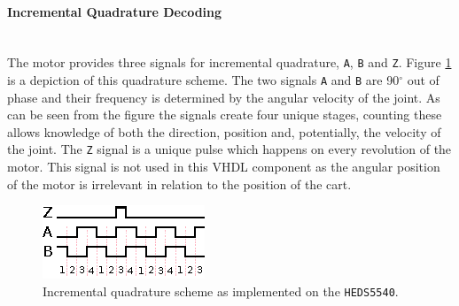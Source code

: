 \paragraph{Incremental Quadrature Decoding}~\\ %
\label{par:incremental_quadrature}
The motor provides three signals for incremental quadrature, \texttt{A}, \texttt{B} and \texttt{Z}. 
Figure \ref{fig:quadrature} is a depiction of this quadrature scheme.
The two signals \texttt{A} and \texttt{B} are 90$^\circ$ out of phase and their frequency is determined by the angular velocity of the joint.
As can be seen from the figure the signals create four unique stages, counting these allows knowledge of both the direction, position and, potentially, the velocity of the joint.
The \texttt{Z} signal is a unique pulse which happens on every revolution of the motor.
This signal is not used in this VHDL component as the angular position of the motor is irrelevant in relation to the position of the cart.

\begin{figure}[h]
	\centering
	\includegraphics[width=.5\linewidth]{graphics/quadrature}
	\caption{Incremental quadrature scheme as implemented on the \texttt{HEDS5540}.}
	\label{fig:quadrature}
\end{figure}

